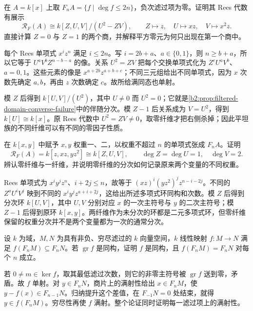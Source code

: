 \BookExercises

\begin{optionalexercise}\label{b2:ex:20-coarse-filtration}
	在 \(A=k[x]\) 上取 \(F_nA=\{f\mid\deg f\le2n\}\)，负次滤过项为零。证明其 Rees 代数有展示
	\[
		\mathcal R_F(A)\cong k[Z,U,V]/(U^2-ZV), \qquad Z\mapsto z,\quad U\mapsto xz,\quad V\mapsto x^2z.
	\]
	直接计算 \(Z=0\) 与 \(Z=1\) 的两个商，并解释平方零元为何只出现在第一个商中。
\end{optionalexercise}
\begin{solution}
	每个 Rees 单项式 \(x^iz^n\) 满足 \(i\le2n\)。写 \(i=2b+a\)、\(a\in\{0,1\}\)，则 \(n\ge b+a\)，所以它等于 \(U^aV^bZ^{n-b-a}\) 的像。关系 \(U^2=ZV\) 把每个交换单项式化为 \(Z^cU^aV^b\)、\(a=0,1\)。这些元素的像是 \(x^{a+2b}z^{a+b+c}\)；不同三元组给出不同单项式，因为 \(x\) 次数先确定 \(a,b\)，再由 \(z\) 次数确定 \(c\)。故所给满同态也单射。

	模 \(Z\) 后得到 \(k[U,V]/(U^2)\)，其中 \(U\ne0\) 而 \(U^2=0\)；它就是\cref{b2:prop:filtered-domain-converse-failure}中的伴随分次。模 \(Z-1\) 后关系成为 \(V=U^2\)，得到 \(k[U]\cong k[x]\)。原 Rees 代数中 \(U^2=ZV\ne0\)，取零纤维才把右侧杀掉；因此平坦族的不同纤维可以有不同的零因子性质。
\end{solution}

\begin{optionalexercise}\label{b2:ex:20-polynomial-rees}
	在 \(k[x,y]\) 中赋予 \(x,y\) 权重一、二，以权重不超过 \(n\) 的单项式张成 \(F_nA\)。证明
	\[
		\mathcal R_F(A)=k[z,xz,yz^2]\cong k[Z,U,V], \qquad \deg Z=\deg U=1,\quad\deg V=2.
	\]
	辨认零纤维与一纤维，并说明零纤维的分次如何记录原来两个变量的不同权重。
\end{optionalexercise}
\begin{solution}
	Rees 单项式为 \(x^iy^jz^n\)、\(i+2j\le n\)，故等于 \((xz)^i(yz^2)^jz^{n-i-2j}\)。不同的 \(Z^aU^iV^j\) 映到不同的 \(x^iy^jz^{a+i+2j}\)，这给出所述多项式环同构和次数。模 \(Z\) 后得到分次环 \(k[U,V]\)，其中 \(U,V\) 分别对应 \(x\) 的一次主符号与 \(y\) 的二次主符号；模 \(Z-1\) 后得到原环 \(k[x,y]\)。两纤维作为未分次的环都是二元多项式环，但零纤维保留的权重分次并不是两个变量都为一次的通常分次。
\end{solution}

\begin{optionalexercise}\label{b2:ex:20-filtered-isomorphism}
	设 \(k\) 为域，\(M,N\) 为具有非负、穷尽滤过的 \(k\) 向量空间，\(k\) 线性映射 \(f:M\to N\) 满足 \(f(F_nM)\subseteq F_nN\)。若 \(\operatorname{gr}f\) 是同构，证明 \(f\) 是同构，且 \(f(F_nM)=F_nN\) 对每个 \(n\) 成立。
\end{optionalexercise}
\begin{solution}
	若 \(0\ne m\in\ker f\)，取其最低滤过次数，则它的非零主符号被 \(\operatorname{gr}f\) 送到零，矛盾。故 \(f\) 单射。对 \(y\in F_nN\)，商片上的满射性给出 \(x\in F_nM\)，使 \(y-f(x)\in F_{n-1}N\)。归纳提升这个差值，在 \(F_{-1}N=0\) 处结束，就得 \(y\in f(F_nM)\)。穷尽性再使 \(f\) 满射。整个论证同时证明每一滤过项上的满射性。
\end{solution}

